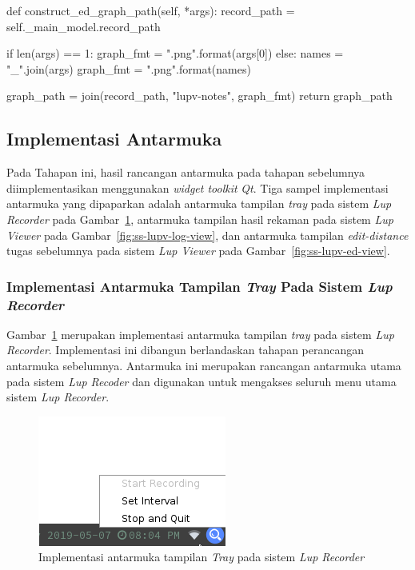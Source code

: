 \par\null\par
\begin{code}
\begin{ignasicblock}[title=construct\_ed\_graph\_path,minted language=Python]
def construct_ed_graph_path(self, *args):
  record_path = self._main_model.record_path

  if len(args) == 1:
    graph_fmt = "{}.png".format(args[0])
  else:
    names = "_".join(args)
    graph_fmt = "{}.png".format(names)

  graph_path = join(record_path, "lupv-notes", graph_fmt)
  return graph_path
\end{ignasicblock}
  \label{code:load_data}
\end{code}

\subsection{Implementasi Antarmuka}

Pada Tahapan ini, hasil rancangan antarmuka pada tahapan sebelumnya
diimplementasikan menggunakan \emph{widget toolkit} \emph{Qt}.
Tiga sampel implementasi antarmuka yang dipaparkan adalah antarmuka tampilan
\emph{tray} pada sistem \emph{Lup Recorder} pada
Gambar~\ref{fig:ss-lupr-tray}, antarmuka tampilan hasil rekaman pada
sistem \emph{Lup Viewer} pada Gambar~\ref{fig:ss-lupv-log-view}, dan
antarmuka tampilan \emph{edit-distance} tugas sebelumnya pada sistem
\emph{Lup Viewer} pada Gambar~\ref{fig:ss-lupv-ed-view}.

\subsubsection{Implementasi Antarmuka Tampilan \emph{Tray} Pada Sistem \emph{Lup Recorder}}

Gambar~\ref{fig:ss-lupr-tray} merupakan implementasi antarmuka
tampilan \emph{tray} pada sistem \emph{Lup Recorder}. Implementasi ini
dibangun berlandaskan tahapan perancangan antarmuka
sebelumnya. Antarmuka ini merupakan rancangan antarmuka utama pada
sistem \emph{Lup Recoder} dan digunakan untuk mengakses seluruh menu
utama sistem \emph{Lup Recorder}.

\begin{figure}[H]
  \centering
  \includegraphics[width=.5\linewidth]{img/ui/ss-lupr-tray}
  \caption{Implementasi antarmuka tampilan \emph{Tray} pada sistem
    \emph{Lup Recorder}}\label{fig:ss-lupr-tray}
\end{figure}

